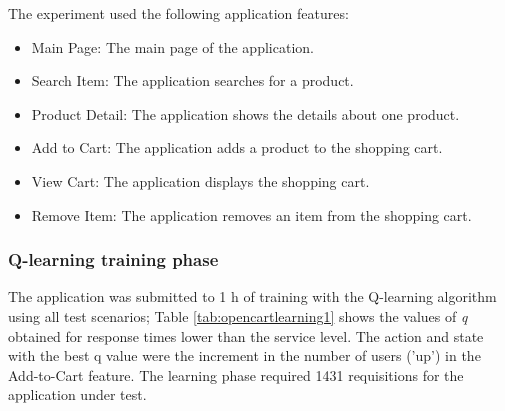 \documentclass{bmcart}
\begin{document}
The experiment used the following application features:

\begin{itemize}
\item Main Page: The main page of the application.
\item Search Item: The application searches for a product.
\item Product Detail: The application shows  the details about one product.
\item Add to Cart: The application adds a product to the shopping cart.
\item View Cart: The application displays the shopping cart.
\item Remove Item: The application removes an item from the shopping cart. 
\end{itemize}

\subsubsection{Q-learning training phase}

The application was submitted to 1 h of training with the  Q-learning algorithm using all test scenarios;  Table \ref{tab:opencartlearning1} shows the values of \textit{q}  obtained for response times lower than the service level. The action and state with the best q value were the increment in the number of users ('up') in the Add-to-Cart feature. The learning phase required 1431 requisitions for the application under test. 
\end{document}
